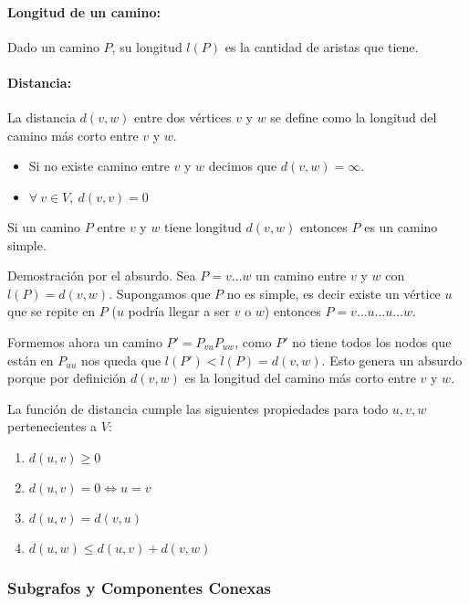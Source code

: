 \paragraph{Longitud de un camino:} Dado un camino \(P\), su longitud \(l(P)\) es la cantidad de aristas que tiene.

\paragraph{Distancia:} La distancia \(d(v,w)\) entre dos vértices \(v\) y \(w\) se define como la longitud del camino más corto entre \(v\) y \(w\).
\begin{itemize}
	\item Si no existe camino entre \(v\) y \(w\) decimos que \(d(v,w) = \infty\).
	\item \(\forall~v\in V,~d(v,v) = 0\)
\end{itemize}

\begin{proposicion}
	Si un camino \(P\) entre \(v\) y \(w\) tiene longitud \(d(v,w)\) entonces \(P\) es un camino simple.
\end{proposicion}
\begin{demo}
	Demostración por el absurdo. Sea \(P = v\dots w\) un camino entre \(v\) y \(w\) con \(l(P) = d(v,w)\). Supongamos que \(P\) no es simple, es decir existe un vértice \(u\) que se repite en \(P\) (\(u\) podría llegar a ser \(v\) o \(w\)) entonces \(P = v\dots u \dots u \dots w\).

	Formemos ahora un camino \(P' = P_{vu}P_{uw}\), como \(P'\) no tiene todos los nodos que están en \(P_{uu}\) nos queda que \(l(P') < l(P) = d(v,w)\). Esto genera un absurdo porque por definición \(d(v,w)\) es la longitud del camino más corto entre \(v\) y \(w\).
\end{demo}

\begin{proposicion}
	La función de distancia cumple las siguientes propiedades para todo \(u,v,w\) pertenecientes a \(V\):
	\begin{enumerate}
		\item \(d(u,v)\geq 0\)
		\item \(d(u,v)=0 \iff u=v\)
		\item \(d(u,v) = d(v,u)\)
		\item \(d(u,w) \leq d(u,v) + d(v,w)\)
	\end{enumerate}
\end{proposicion}

\subsubsection{Subgrafos y Componentes Conexas}

